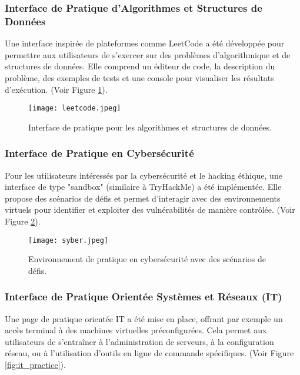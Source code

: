 \documentclass[12pt, a4paper]{article}
\begin{document}
\subsubsection{Interface de Pratique d'Algorithmes et Structures de Données}
Une interface inspirée de plateformes comme LeetCode a été développée pour permettre aux utilisateurs de s'exercer sur des problèmes d'algorithmique et de structures de données. Elle comprend un éditeur de code, la description du problème, des exemples de tests et une console pour visualiser les résultats d'exécution. (Voir Figure \ref{fig:leetcode_practice}).

\begin{figure}[htbp]
  \centering
  \texttt{[image: leetcode.jpeg]} %
  \caption{Interface de pratique pour les algorithmes et structures de données.}
  \label{fig:leetcode_practice}
\end{figure}

\subsubsection{Interface de Pratique en Cybersécurité}
Pour les utilisateurs intéressés par la cybersécurité et le hacking éthique, une interface de type "sandbox" (similaire à TryHackMe) a été implémentée. Elle propose des scénarios de défis et permet d'interagir avec des environnements virtuels pour identifier et exploiter des vulnérabilités de manière contrôlée. (Voir Figure \ref{fig:cybersecurity_practice}).

\begin{figure}[htbp]
  \centering
  \texttt{[image: syber.jpeg]} %
  \caption{Environnement de pratique en cybersécurité avec des scénarios de défis.}
  \label{fig:cybersecurity_practice}
\end{figure}

\subsubsection{Interface de Pratique Orientée Systèmes et Réseaux (IT)}
Une page de pratique orientée IT a été mise en place, offrant par exemple un accès terminal à des machines virtuelles préconfigurées. Cela permet aux utilisateurs de s'entraîner à l'administration de serveurs, à la configuration réseau, ou à l'utilisation d'outils en ligne de commande spécifiques. (Voir Figure \ref{fig:it_practice}).
\end{document}
